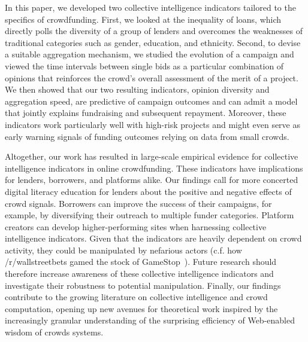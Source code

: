 \documentclass[sigconf]{acmart}
\begin{document}
In this paper, we developed two collective intelligence indicators tailored to the specifics of crowdfunding. First, we looked at the inequality of loans, which directly polls the diversity of a group of lenders and overcomes the weaknesses of traditional categories such as gender, education, and ethnicity. Second, to devise a suitable aggregation mechanism, we studied the evolution of a campaign and viewed the time intervals between single bids as a particular combination of opinions that reinforces the crowd's overall assessment of the merit of a project. We then showed that our two resulting indicators, opinion diversity and aggregation speed, are predictive of campaign outcomes and can admit a model that jointly explains fundraising and subsequent repayment. Moreover, these indicators work particularly well with high-risk projects and might even serve as early warning signals of funding outcomes relying on data from small crowds. 

Altogether, our work has resulted in large-scale empirical evidence for collective intelligence indicators in online crowdfunding. These indicators have implications for lenders, borrowers, and platforms alike. Our findings call for more concerted digital literacy education for lenders about the positive and negative effects of crowd signals. Borrowers can improve the success of their campaigns, for example, by diversifying their outreach to multiple funder categories. Platform creators can develop higher-performing sites when harnessing collective intelligence indicators. Given that the indicators are heavily dependent on crowd activity, they could be manipulated by nefarious actors (c.f. how /r/wallstreetbets gamed the stock of GameStop~\cite{mendoza2021sticking}). Future research should therefore increase awareness of these collective intelligence indicators and investigate their robustness to potential manipulation. Finally, our findings contribute to the growing literature on collective intelligence and crowd computation, opening up new avenues for theoretical work inspired by the increasingly granular understanding of the surprising efficiency of Web-enabled wisdom of crowds systems.



\end{document}
